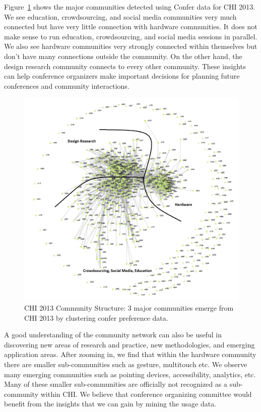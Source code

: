 \documentclass{sigchi}
\begin{document}
Figure~\ref{chi2013-community-view-10} shows the major communities detected using Confer data for CHI 2013. We see education, crowdsourcing, and social media communities very much connected but have very little connection with hardware communities. It does not make sense to run education, crowdsourcing, and social media sessions in parallel. We also see hardware communities very strongly connected within themselves but don't have many connections outside the community.  On the other hand, the design research community connects to every other community. These insights can help conference organizers make important decisions for planning future conferences and community interactions.
\begin{figure}[!h]
\centering
\includegraphics[width=0.95\columnwidth]{chi2013-community-view-10.png}
\caption{CHI 2013 Community Structure: 3 major communities emerge from CHI 2013 by clustering confer preference data.}
\label{chi2013-community-view-10}
\end{figure}

A good understanding of the community network can also be useful in discovering new areas of research and practice, new methodologies, and emerging application areas. After zooming in, we find that within the hardware community there are smaller sub-communities such as gesture, multitouch etc. We observe many emerging communities such as pointing devices, accessibility, analytics, etc.  Many of these smaller sub-communities are officially not recognized as a sub-community within CHI. We believe that conference organizing committee would benefit from the insights that we can gain by mining the usage data.
\end{document}
